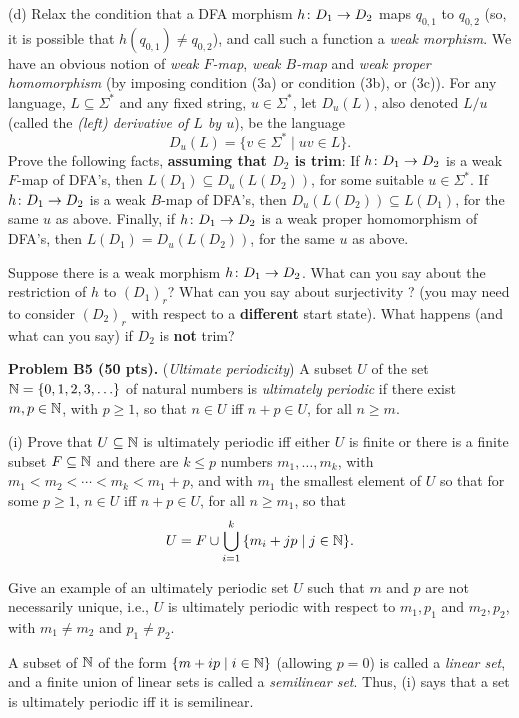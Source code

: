 \documentclass[12pt]{article}
\begin{document}
\medskip
(d)
Relax the condition that a DFA morphism
$h\colon D_1\rightarrow D_2$ maps $q_{0, 1}$ to $q_{0, 2}$
(so, it is possible that $h(q_{0, 1})\not= q_{0, 2}$), and call
such a function a {\it weak morphism\/}.
We have an obvious notion of {\it weak $F$-map\/},
{\it weak $B$-map\/} and {\it weak proper
homomorphism\/}
(by imposing condition (3a) or
condition (3b), or (3c)).
For any language, $L \subseteq \Sigma^*$ and any fixed
string, $u\in \Sigma^*$, let $D_u(L)$, also denoted
$L/u$ (called the  {\it (left) derivative of $L$ by $u$\/}), be
the language
\[
D_u(L) = \{v\in \Sigma^*\mid uv \in L\}.
\]
Prove the following facts, 
{\bf assuming that $D_2$ is trim}:
If $h\colon D_1\rightarrow D_2$  is a weak $F$-map of DFA's, then
$L(D_1) \subseteq D_u(L(D_2))$, 
for some suitable $u\in\Sigma^*$.
If $h\colon D_1\rightarrow D_2$  is a weak $B$-map of DFA's, then
$D_u(L(D_2)) \subseteq L(D_1)$,
for the same $u$ as above.
Finally, if $h\colon D_1\rightarrow D_2$  is a weak proper  
homomorphism of DFA's, then
$L(D_1) = D_u(L(D_2))$,
for the same $u$ as above.

\medskip
Suppose there is a weak morphism
$h\colon D_1\rightarrow D_2$. What can you say about
the restriction of $h$ to $(D_1)_r$?
What can you say about surjectivity ?
(you may need
to consider $(D_2)_r$ with respect to a {\bf different}
start state). What happens (and what can you say)
if $D_2$ is {\bf not} trim?




\vspace {0.25cm}\noindent
{\bf Problem B5 (50 pts).} ({\it Ultimate periodicity\/})
A subset $U$ of the set $\mathbb{N} = \{0, 1, 2, 3,\ldots\}$
of natural numbers is {\it ultimately periodic\/}
if there exist $m, p\in \mathbb{N}$, with $p \geq 1$, so that
$n\in U$ iff $n + p\in U$, for all $n\geq m$.

\medskip
(i)
Prove that $U\subseteq \mathbb{N}$ is ultimately periodic 
iff either $U$ is finite or there is a finite subset 
$F\subseteq \mathbb{N}$
and there are $k \leq p$ 
numbers $m_1, \ldots, m_k$, with
$m_1 < m_2 < \cdots < m_k < m_1 + p$,
and with $m_1$ the smallest
element of $U$ so that for some $p \geq 1$,
$n\in U$ iff $n + p\in U$, for all $n\geq m_1$,
so that 
\[U = F \cup \bigcup_{i = 1}^k \, \{m_i + jp\mid j\in \mathbb{N}\}.\]

\medskip
Give an example of an ultimately periodic set $U$
such that $m$ and $p$ are not necessarily unique, i.e.,
$U$ is ultimately periodic with respect to
$m_1, p_1$ and $m_2, p_2$, with $m_1\not= m_2$ and $p_1\not= p_2$.

\remark
A subset of $\mathbb{N}$ of the form
$\{m + i p \mid i\in \mathbb{N}\}$ (allowing $p = 0$)
is called a {\it linear set\/}, and
a finite union of linear sets is called a {\it semilinear set\/}.
Thus, (i) says that a set is ultimately periodic iff it is semilinear.
\end{document}
